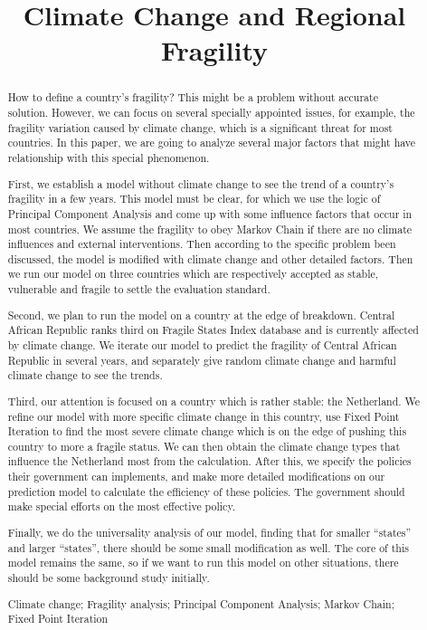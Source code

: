 \documentclass{mcmthesis}
\title{Climate Change and Regional Fragility}
\author{}
\date{}
\begin{document}
	\begin{abstract}
		How to define a country’s fragility? This might be a problem without accurate solution. However, we can focus on several specially appointed issues, for example, the fragility variation caused by climate change, which is a significant threat for most countries. In this paper, we are going to analyze several major factors that might have relationship with this special phenomenon.
		
		First, we establish a model without climate change to see the trend of a country’s fragility in a few years. This model must be clear, for which we use the logic of Principal Component Analysis and come up with some influence factors that occur in most countries. We assume the fragility to obey Markov Chain if there are no climate influences and external interventions. Then according to the specific problem been discussed, the model is modified with climate change and other detailed factors. Then we run our model on three countries which are respectively accepted as stable, vulnerable and fragile to settle the evaluation standard.
		
		Second, we plan to run the model on a country at the edge of breakdown. Central African Republic ranks third on Fragile States Index database and is currently affected by climate change. We iterate our model to predict the fragility of Central African Republic in several years, and separately give random climate change and harmful climate change to see the trends.
		
		Third, our attention is focused on a country which is rather stable: the Netherland. We refine our model with more specific climate change in this country, use Fixed Point Iteration to find the most severe climate change which is on the edge of pushing this country to more a fragile status. We can then obtain the climate change types that influence the Netherland most from the calculation. After this, we specify the policies their government can implements, and make more detailed modifications on our prediction model to calculate the efficiency of these policies. The government should make special efforts on the most effective policy.
		
		Finally, we do the universality analysis of our model, finding that for smaller “states” and larger “states”, there should be some small modification as well. The core of this model remains  the same, so if we want to run this model on other situations, there should be some background study initially.		
		
		\begin{keywords}
			Climate change; Fragility analysis; Principal Component Analysis; Markov Chain; Fixed Point Iteration
		\end{keywords}
	\end{abstract}
	\maketitle
	
\end{document}
